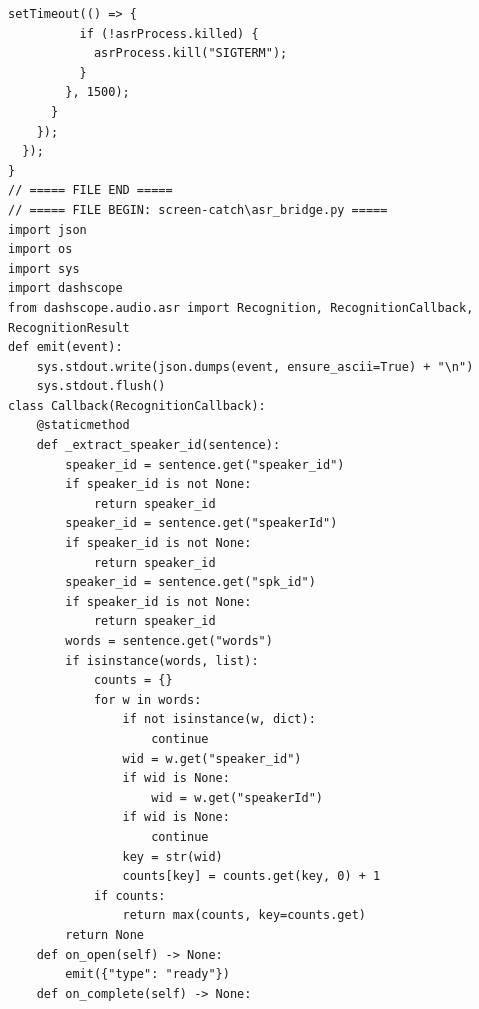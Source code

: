 \documentclass[12pt,a4paper]{article}
\begin{document}
\begin{Verbatim}[fontsize=\footnotesize]
        setTimeout(() => {
          if (!asrProcess.killed) {
            asrProcess.kill("SIGTERM");
          }
        }, 1500);
      }
    });
  });
}
// ===== FILE END =====
// ===== FILE BEGIN: screen-catch\asr_bridge.py =====
import json
import os
import sys
import dashscope
from dashscope.audio.asr import Recognition, RecognitionCallback, RecognitionResult
def emit(event):
    sys.stdout.write(json.dumps(event, ensure_ascii=True) + "\n")
    sys.stdout.flush()
class Callback(RecognitionCallback):
    @staticmethod
    def _extract_speaker_id(sentence):
        speaker_id = sentence.get("speaker_id")
        if speaker_id is not None:
            return speaker_id
        speaker_id = sentence.get("speakerId")
        if speaker_id is not None:
            return speaker_id
        speaker_id = sentence.get("spk_id")
        if speaker_id is not None:
            return speaker_id
        words = sentence.get("words")
        if isinstance(words, list):
            counts = {}
            for w in words:
                if not isinstance(w, dict):
                    continue
                wid = w.get("speaker_id")
                if wid is None:
                    wid = w.get("speakerId")
                if wid is None:
                    continue
                key = str(wid)
                counts[key] = counts.get(key, 0) + 1
            if counts:
                return max(counts, key=counts.get)
        return None
    def on_open(self) -> None:
        emit({"type": "ready"})
    def on_complete(self) -> None:
\end{Verbatim}
\newpage
{}
\fancyhead[R]{}
\end{document}
